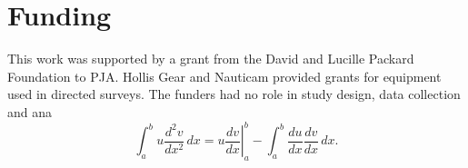 \section{Funding}
\label{funding} 
This work was supported by a grant from the David and Lucille Packard Foundation to PJA. Hollis Gear and Nauticam provided grants for equipment used in directed surveys. The funders had no role in study design, data collection and ana
\begin{equation}
\label{eqn:drag}
	\int_a^bu\frac{d^2v}{dx^2}\,dx
	=\left.u\frac{dv}{dx}\right|_a^b
	-\int_a^b\frac{du}{dx}\frac{dv}{dx}\,dx.
\end{equation}
